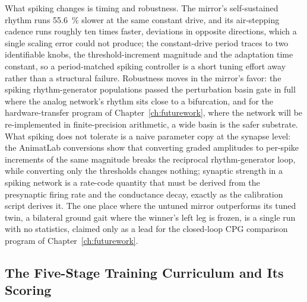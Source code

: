 What spiking changes is timing and robustness. The mirror's self-sustained rhythm runs \qty{55.6}{\percent} slower at the same constant drive, and its air-stepping cadence runs roughly ten times faster, deviations in opposite directions, which a single scaling error could not produce; the constant-drive period traces to two identifiable knobs, the threshold-increment magnitude and the adaptation time constant, so a period-matched spiking controller is a short tuning effort away rather than a structural failure. Robustness moves in the mirror's favor: the spiking rhythm-generator populations passed the perturbation basin gate in full where the analog network's rhythm sits close to a bifurcation, and for the hardware-transfer program of Chapter~\ref{ch:futurework}, where the network will be re-implemented in finite-precision arithmetic, a wide basin is the safer substrate. What spiking does not tolerate is a naive parameter copy at the synapse level: the AnimatLab conversions show that converting graded amplitudes to per-spike increments of the same magnitude breaks the reciprocal rhythm-generator loop, while converting only the thresholds changes nothing; synaptic strength in a spiking network is a rate-code quantity that must be derived from the presynaptic firing rate and the conductance decay, exactly as the calibration script derives it. The one place where the untuned mirror outperforms its tuned twin, a bilateral ground gait where the winner's left leg is frozen, is a single run with no statistics, claimed only as a lead for the closed-loop CPG comparison program of Chapter~\ref{ch:futurework}.

\subsection{The Five-Stage Training Curriculum and Its Scoring}\label{sec:sns_curriculum}

